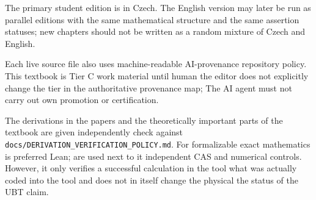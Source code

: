 The primary student edition is in Czech. The English version may later be run as
parallel editions with the same mathematical structure and the same assertion statuses;
new chapters should not be written as a random mixture of Czech and English.

Each live source file also uses machine-readable AI-provenance
repository policy. This textbook is Tier C work material until human
the editor does not explicitly change the tier in the authoritative provenance map; The AI agent must not
carry out own promotion or certification.

The derivations in the papers and the theoretically important parts of the textbook are given independently
check against \texttt{docs/DERIVATION\_VERIFICATION\_POLICY.md}. For
formalizable exact mathematics is preferred Lean; are used next to it
independent CAS and numerical controls. However, it only verifies a successful calculation in the tool
what was actually coded into the tool and does not in itself change the physical
the status of the UBT claim.
